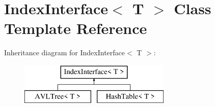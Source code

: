 \hypertarget{classIndexInterface}{}\section{Index\+Interface$<$ T $>$ Class Template Reference}
\label{classIndexInterface}
Inheritance diagram for Index\+Interface$<$ T $>$\+:\begin{figure}[H]
\begin{center}
\leavevmode
\includegraphics[height=2.000000cm]{classIndexInterface}
\end{center}
\end{figure}
